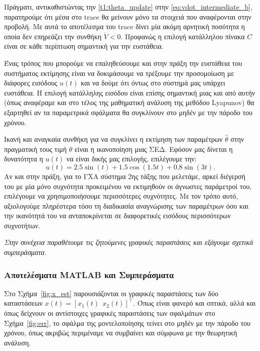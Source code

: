 \documentclass[12pt]{article} %
\numberwithin{equation}{section}  %
\begin{document}
Πράγματι, αντικαθιστώντας την \eqref{t1:theta_update} στην \eqref{eq:vdot_intermediate_b}, παρατηρούμε ότι μέσα στο trace θα μείνουν μόνο τα στοιχειά που αναφέρονται στην προβολή. 
Με αυτά το αποτέλεσμα του trace δίνει μία ακόμη αρνητική ποσότητα η οποία δεν επηρεάζει την συνθήκη $\dot{V} < 0$.
Προφανώς η επιλογή κατάλληλου πίνακα $C$ είναι σε κάθε περίπτωση σημαντική για την ευστάθεια.

Ένας τρόπος που μπορούμε να επαληθεύσουμε και στην πράξη την ευστάθεια του συστήματος εκτίμησης 
είναι να δοκιμάσουμε να τρέξουμε την προσομοίωση με διάφορες εισόδους $u(t)$ και να δούμε ότι όντως στο σύστημά μας υπάρχει ευστάθεια.
Η επιλογή κατάλληλης εισόδου είναι επίσης σημαντική μιας και από αυτήν (όπως αναφέραμε και στο τέλος της μαθηματική ανάλυση της μεθόδου Lyapunov)
θα εξαρτηθεί αν τα παραμετρικά σφάλματα θα συγκλίνουν στο μηδέν με την πάροδο του χρόνου.  

Ικανή και αναγκαία συνθήκη για να συγκλίνει η εκτίμηση των παραμέτρων $\hat\theta$ στην πραγματική τους τιμή $\theta$ είναι η ικανοποίηση μιας ΣΕΔ.
Εφόσον μας δίνεται η δυνατότητα η $u(t)$ να είναι δικής μας επιλογής, επιλέγουμε την:
\begin{equation}\label{t1:u}
    u(t) = 2.5  \sin(t) + 1.5  \cos(1.5 t) + 0.8  \sin(3 t).
\end{equation}
Αν και στην πράξη, για το ΓΧΑ σύστημα 2ης τάξης που μελετάμε, αρκεί διέγερσή του με μία μόνο συχνότητα προκειμένου να εκτιμηθούν οι άγνωστες παράμετροί του, επιλέγουμε να χρησιμοποιήσουμε περισσότερες συχνότητες. 
Με τον τρόπο αυτό, αξιολογούμε πληρέστερα τόσο τη διαδικασία αναγνώρισης των παραμέτρων όσο και την ικανότητά του να ανταποκρίνεται σε διαφορετικές εισόδους περισσότερων συχνοτήτων. 

\begin{center}
    \textit{Στην συνέχεια παραθέτουμε τις ζητούμενες γραφικές παραστάσεις και εξάγουμε σχετικά συμπεράσματα.}
\end{center}



\subsubsection{Αποτελέσματα MATLAB και Συμπεράσματα}

Στο Σχήμα~\ref{fig:x_est} παρουσιάζονται οι γραφικές παραστάσεις των δύο καταστάσεων $x(t) = [x_1(t) \ \ x_2(t)]^{\top}$.
Όπως είναι φανερό και οπτικά, αλλά και όπως δείχνουν οι αντίστοιχες γραφικές παραστάσεις των σφαλμάτων στο Σχήμα~\ref{fig:err}, 
το σφάλμα της μοντελοποίησης τείνει στο μηδέν με την πάροδο του χρόνου, όπως ακριβώς περιμέναμε να συμβαίνει και σύμφωνα με την θεωρητική ανάλυση. 
\end{document}
